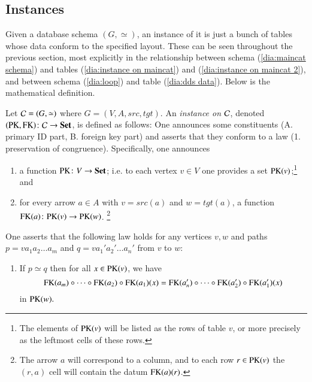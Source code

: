
\subsection{Instances}

Given a database schema $(G,\simeq)$, an instance of it is just a bunch of tables whose data conform to the specified layout. These can be seen throughout the previous section, most explicitly in the relationship between schema (\ref{dia:maincat schema}) and tables (\ref{dia:instance on maincat}) and (\ref{dia:instance on maincat 2}), and between schema (\ref{dia:loop}) and table (\ref{dia:dds data}). Below is the mathematical definition.

\begin{definition}\label{def:instance}

Let $\mathcal{C}=(G,\simeq)$ where $G=(V,A,src,tgt)$. An {\em instance on $\mathcal{C}$}, denoted $(\PK,\FK)\taking\mcC\to\Set$, is defined as follows: One announces some constituents (A. primary ID part, B. foreign key part) and asserts that they conform to a law (1. preservation of congruence). Specifically, one announces
\begin{enumerate}[\hsp A.]
\item a function $\PK\taking V\to \Set$; i.e. to each vertex $v\in V$ one provides a set $\PK(v)$;\footnote{The elements of $\PK(v)$ will be listed as the rows of table $v$, or more precisely as the leftmost cells of these rows.} and
\item for every arrow $a\in A$ with $v=src(a)$ and $w=tgt(a)$, a function $\FK(a)\taking\PK(v)\to\PK(w)$.
\footnote{The arrow $a$ will correspond to a column, and to each row $r\in\PK(v)$ the $(r,a)$ cell will contain the datum $\FK(a)(r)$.}
\end{enumerate}
One asserts that the following law holds for any vertices $v, w$ and paths $p=va_1a_2\ldots a_m$ and $q=va_1'a_2'\ldots a_n'$ from $v$ to $w$:
\begin{enumerate}[\hsp 1.]
\item If $p\simeq q$ then for all $x\in\PK(v)$, we have $$\FK(a_m)\circ\cdots\circ\FK(a_2)\circ\FK(a_1)(x)=\FK(a_n')\circ\cdots\circ\FK(a_2')\circ\FK(a_1')(x)$$ in $\PK(w).$
\end{enumerate}

\end{definition}


